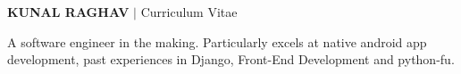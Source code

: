 \documentclass[10pt,a4paper]{extarticle}
\begin{document}
\noindent
	\begin{flushleft}
	\begin{LARGE}
		{
		\color{resumeBlueLight}
			\bfseries{ KUNAL RAGHAV} 
		}$|$ {\color{gray}Curriculum Vitae}\\					
	\end{LARGE}
		\vspace{2.5mm}
		A software engineer in the making. Particularly excels at native android app development, past
		experiences in Django, Front-End Development and python-fu.\\


\end{flushleft}
\end{document}
